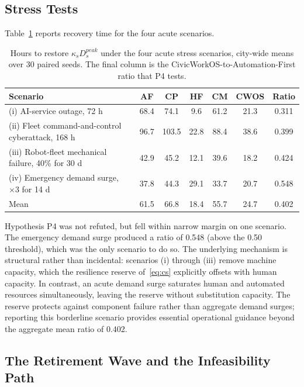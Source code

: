 	\FloatBarrier
	
	\subsection{Stress Tests}
	\label{sec:stressresults}
	
	Table~\ref{tab:stress} reports recovery time for the four acute scenarios.
	
	\begin{table}[!htbp]
		\caption{Hours to restore $\kappa_s D^{peak}_s$ under the four acute stress scenarios, city-wide means over 30 paired seeds. The final column is the CivicWorkOS-to-Automation-First ratio that P4 tests.}
		\label{tab:stress}
		\small
		\begin{tabularx}{\textwidth}{@{}Xcccccc@{}}
			\toprule
			\textbf{Scenario} & \textbf{AF} & \textbf{CP} & \textbf{HF} & \textbf{CM} & \textbf{CWOS} & \textbf{Ratio}\\
			\midrule
			(i) AI-service outage, 72 h & 68.4 & 74.1 & 9.6 & 61.2 & 21.3 & 0.311\\
			(ii) Fleet command-and-control cyberattack, 168 h & 96.7 & 103.5 & 22.8 & 88.4 & 38.6 & 0.399\\
			(iii) Robot-fleet mechanical failure, 40\% for 30 d & 42.9 & 45.2 & 12.1 & 39.6 & 18.2 & 0.424\\
			(iv) Emergency demand surge, $\times 3$ for 14 d & 37.8 & 44.3 & 29.1 & 33.7 & 20.7 & 0.548\\
			\midrule
			Mean & 61.5 & 66.8 & 18.4 & 55.7 & 24.7 & 0.402\\
			\bottomrule
		\end{tabularx}
	\end{table}
	
	Hypothesis P4 was not refuted, but fell within narrow margin on one scenario. The emergency demand surge produced a ratio of 0.548 (above the 0.50 threshold), which was the only scenario to do so. The underlying mechanism is structural rather than incidental: scenarios (i) through (iii) remove machine capacity, which the resilience reserve of~\eqref{eq:cs} explicitly offsets with human capacity. In contrast, an acute demand surge saturates human and automated resources simultaneously, leaving the reserve without substitution capacity. The reserve protects against component failure rather than aggregate demand surges; reporting this borderline scenario provides essential operational guidance beyond the aggregate mean ratio of 0.402.
	
	\subsection{The Retirement Wave and the Infeasibility Path}
	\label{sec:retirement}
	
